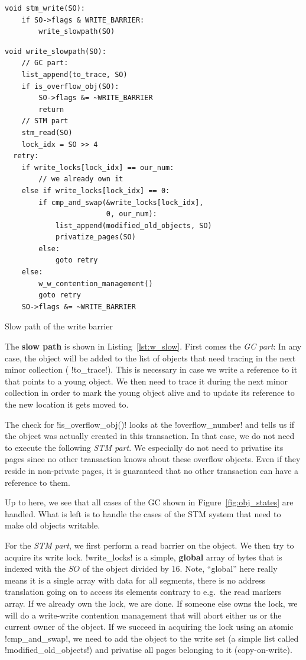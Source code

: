 \documentclass{sigplanconf}
\makeatletter
\renewcommand\lstinline[1][]{%
  \Collectverb{\@@myverb}%
}
\def\@@myverb#1{%
    \begingroup
    \fboxsep=0.2em
    \colorbox{verylightgray}{\oldlstinline|#1|}%
    \endgroup
}
\makeatother
\begin{document}
\begin{lstlisting}
void stm_write(SO):
	if SO->flags & WRITE_BARRIER:
		write_slowpath(SO)
\end{lstlisting}

\begin{code}[h]
\begin{lstlisting}
void write_slowpath(SO):
	// GC part:
	list_append(to_trace, SO)
	if is_overflow_obj(SO):
		SO->flags &= ~WRITE_BARRIER
		return
	// STM part
	stm_read(SO)
	lock_idx = SO >> 4
  retry:
	if write_locks[lock_idx] == our_num:
		// we already own it
	else if write_locks[lock_idx] == 0:
		if cmp_and_swap(&write_locks[lock_idx],
					    0, our_num):
			list_append(modified_old_objects, SO)
			privatize_pages(SO)
		else:
			goto retry
	else:
		w_w_contention_management()
		goto retry
	SO->flags &= ~WRITE_BARRIER
\end{lstlisting}

\caption{Slow path of the write barrier\label{lst:w_slow}}
\end{code}


The \textbf{slow path} is shown in Listing~\ref{lst:w_slow}.
First comes the \emph{GC part}: In any case, the object will be added
to the list of objects that need tracing in the next minor collection
(\lstinline!to_trace!).  This is necessary in case we write a
reference to it that points to a young object. We then need to trace
it during the next minor collection in order to mark the young object
alive and to update its reference to the new location it gets moved
to.

The check for \lstinline!is_overflow_obj()! looks at the
\lstinline!overflow_number!  and tells us if the object was actually
created in this transaction. In that case, we do not need to execute
the following \emph{STM part}.  We especially do not need to privatise
its pages since no other transaction knows about these overflow
objects. Even if they reside in non-private pages, it is guaranteed
that no other transaction can have a reference to them.

Up to here, we see that all cases of the GC shown in
Figure~\ref{fig:obj_states} are handled. What is left is to handle the
cases of the STM system that need to make old objects writable.

For the \emph{STM part}, we first perform a read barrier on the
object. We then try to acquire its write lock. \lstinline!write_locks!
is a simple, \textbf{global} array of bytes that is indexed with the
$SO$ of the object divided by 16. Note, ``global'' here really means
it is a single array with data for all segments, there is no address
translation going on to access its elements contrary to e.g.\ the
read markers array.  If we already own the lock, we are done.
If someone else owns the lock, we will do a write-write contention
management that will abort either us or the current owner of the
object.  If we succeed in acquiring the lock using an atomic
\lstinline!cmp_and_swap!, we need to add the object to the write set
(a simple list called \lstinline!modified_old_objects!)  and privatise
all pages belonging to it (copy-on-write).
\end{document}
